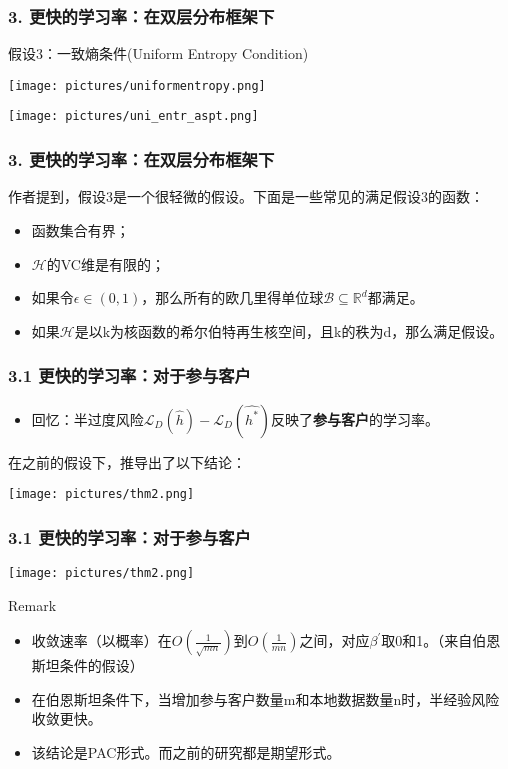 \documentclass{beamer}
\begin{document}
\begin{frame}
    \frametitle{3. 更快的学习率：在双层分布框架下}
    假设3：一致熵条件(Uniform Entropy Condition)
    \begin{center}
        \texttt{[image: pictures/uniformentropy.png]}
    \end{center}
    \pause
    \begin{center}
        \texttt{[image: pictures/uni\_entr\_aspt.png]}
    \end{center}
\end{frame}
\begin{frame}
    \frametitle{3. 更快的学习率：在双层分布框架下}
    作者提到，假设3是一个很轻微的假设。下面是一些常见的满足假设3的函数：
    \begin{itemize}
        \item 函数集合有界；
        \item $\mathcal{H}$的VC维是有限的；
        \item 如果令$\epsilon \in (0,1)$，那么所有的欧几里得单位球$\mathcal{B}\subseteq \mathbb{R}^{d}$都满足。
        \item 如果$\mathcal{H}$是以k为核函数的希尔伯特再生核空间，且k的秩为d，那么满足假设。
    \end{itemize}
\end{frame}
\begin{frame}
    \frametitle{3.1 更快的学习率：对于参与客户}
    \begin{itemize}
    \item 回忆：半过度风险$\mathcal{L}_{D}(\hat{h})-\mathcal{L}_{D}(\hat{h^{*}})$反映了\textbf{参与客户}的学习率。
    \end{itemize}
    \pause
    在之前的假设下，推导出了以下结论：
    \begin{center}
        \texttt{[image: pictures/thm2.png]}
    \end{center}
\end{frame}
\begin{frame}
    \frametitle{3.1 更快的学习率：对于参与客户}
    \begin{center}
        \texttt{[image: pictures/thm2.png]}
    \end{center}
    \begin{alertblock}{Remark}
        \begin{itemize}
            \item 收敛速率（以概率）在$O(\frac{1}{\sqrt{mn}})$到$O(\frac{1}{mn})$之间，对应$\beta^{'}$取0和1。（来自伯恩斯坦条件的假设）
            \item 在伯恩斯坦条件下，当增加参与客户数量m和本地数据数量n时，半经验风险收敛更快。
            \item 该结论是PAC形式。而之前的研究都是期望形式。
        \end{itemize}
    \end{alertblock}
\end{frame}
\end{document}
